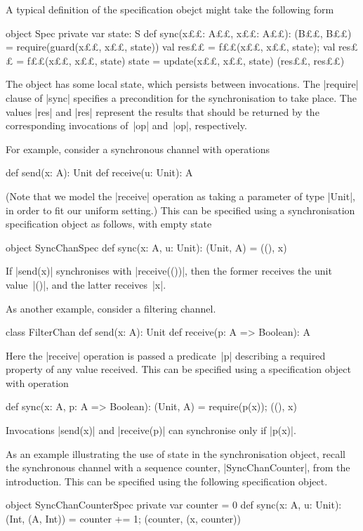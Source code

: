 A typical definition of the specification obejct might take the following form
%
\begin{scala}
object Spec{
  private var state: S
  def sync(x££: A££, x££: A££): (B££, B££) = {
    require(guard(x££, x££, state))
    val res££ = f££(x££, x££, state); val res££ = f££(x££, x££, state)
    state = update(x££, x££, state)
    (res££, res££)
  }
}
\end{scala}
%
The object has some local state, which persists between invocations.  The
|require| clause of |sync| specifies a precondition for the synchronisation to
take place.  The values |res| and |res| represent the results that
should be returned by the corresponding invocations of~|op| and~|op|,
respectively.

For example, consider a synchronous channel with operations
\begin{scala}
  def send(x: A): Unit
  def receive(u: Unit): A
\end{scala}
%
(Note that we model the |receive| operation as taking a parameter of type
|Unit|, in order to fit our uniform setting.) 
%
This can be specified using a synchronisation specification object as follows,
with empty state
\begin{scala}
object SyncChanSpec{
  def sync(x: A, u: Unit): (Unit, A) = ((), x)
}
\end{scala}
%
If |send(x)| synchronises with |receive(())|, then the former receives the
unit value~|()|, and the latter receives~|x|. 

As another example, consider a filtering channel.
\begin{scala}
class FilterChan{
  def send(x: A): Unit
  def receive(p: A => Boolean): A
}
\end{scala}
%
Here the |receive| operation is passed a predicate~|p| describing a required
property of any value received.  This can be specified using a specification
object with operation
%
\begin{scala}
  def sync(x: A, p: A => Boolean): (Unit, A) = { require(p(x)); ((), x) }
\end{scala}
%
Invocations |send(x)| and |receive(p)| can synchronise only if |p(x)|. 

As an example illustrating the use of state in the synchronisation object,
recall the synchronous channel with a sequence counter, |SyncChanCounter|,
from the introduction.  This can be specified using the following
specification object.
%
\begin{scala}
object SyncChanCounterSpec{
  private var counter = 0
  def sync(x: A, u: Unit): (Int, (A, Int)) = {
    counter += 1; (counter, (x, counter))
  }
}
\end{scala}

